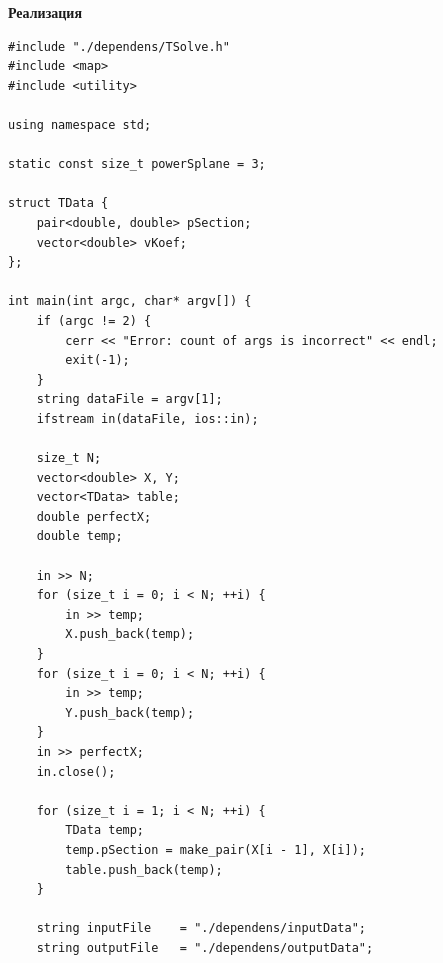 \textbf{Реализация}
\begin{lstlisting}
#include "./dependens/TSolve.h"
#include <map>
#include <utility>

using namespace std;

static const size_t powerSplane = 3;

struct TData {
	pair<double, double> pSection;
	vector<double> vKoef;
};

int main(int argc, char* argv[]) {
	if (argc != 2) {
		cerr << "Error: count of args is incorrect" << endl;
		exit(-1);
	}	
	string dataFile = argv[1];
	ifstream in(dataFile, ios::in);

	size_t N;
	vector<double> X, Y;
	vector<TData> table;
	double perfectX;
	double temp;
		
	in >> N;
	for (size_t i = 0; i < N; ++i) {
		in >> temp;
		X.push_back(temp);	
	}
	for (size_t i = 0; i < N; ++i) {
		in >> temp;
		Y.push_back(temp);	
	}
	in >> perfectX;
	in.close();	

	for (size_t i = 1; i < N; ++i) {
		TData temp;
		temp.pSection = make_pair(X[i - 1], X[i]);
		table.push_back(temp);
	}

	string inputFile 	= "./dependens/inputData";
	string outputFile 	= "./dependens/outputData";


\end{lstlisting}
